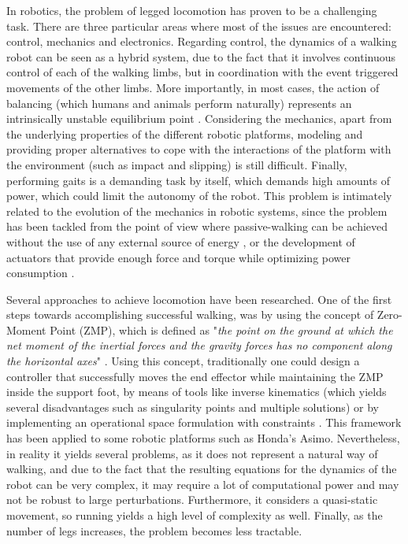 \documentclass[../main.tex]{subfiles}
\begin{document}
	
	In robotics, the problem of legged locomotion has proven to be a challenging task. There are three particular areas where most of the issues are encountered: control, mechanics and electronics. Regarding control, the dynamics of a walking robot can be seen as a hybrid system, due to the fact that it involves continuous control of each of the walking limbs, but in coordination with the event triggered movements of the other limbs. More importantly, in most cases, the action of balancing (which humans and animals perform naturally) represents an intrinsically unstable equilibrium point \cite{Holmes2006}. Considering the mechanics, apart from the underlying properties of the different robotic platforms, modeling and providing proper alternatives to cope with the interactions of the platform with the environment (such as impact and slipping) is still difficult. Finally, performing gaits is a demanding task by itself, which demands high amounts of power, which could limit the autonomy of the robot. This problem is intimately related to the evolution of the mechanics in robotic systems, since the problem has been tackled from the point of view where passive-walking can be achieved without the use of any external source of energy \cite{Wisse2004}, or the development of actuators that provide enough force and torque while optimizing power consumption \cite{Tsagarakis2013}.
	
	Several approaches to achieve locomotion have been researched. One of the first steps towards accomplishing successful walking, was by using the concept of Zero-Moment Point (ZMP), which is defined as "\textit{the point on the ground at which the net moment of the inertial forces and the gravity forces has no component along the horizontal axes}" \cite{Borovac2004}. Using this concept, traditionally one could design a controller that successfully moves the end effector while maintaining the ZMP inside the support foot, by means of tools like inverse kinematics (which yields several disadvantages such as singularity points and multiple solutions) or by implementing an operational space formulation with constraints \cite{Aghili2005}. This framework has been applied to some robotic platforms such as Honda's Asimo. Nevertheless, in reality it yields several problems, as it does not represent a natural way of walking, and due to the fact that the resulting equations for the dynamics of the robot can be very complex, it may require a lot of computational power and may not be robust to large perturbations. Furthermore, it considers a quasi-static movement, so running yields a high level of complexity as well. Finally, as the number of legs increases, the problem becomes less tractable.
	
\end{document}
